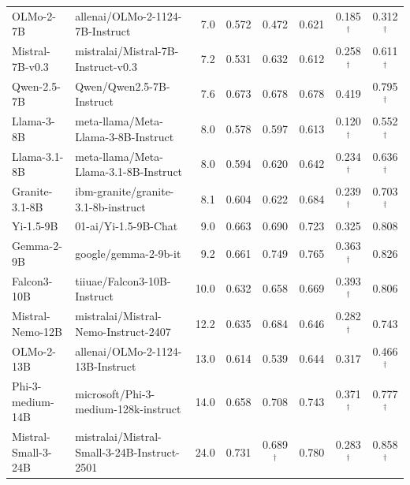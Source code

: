 \documentclass{article} %
\begin{document}
\begin{table}[H]
{\begin{tabular}{llrccccc}
OLMo-2-7B           & allenai/OLMo-2-1124-7B-Instruct            & 7.0  & 0.572            & 0.472            & 0.621            & 0.185$^\dagger$  & 0.312$^\dagger$  \\
Mistral-7B-v0.3     & mistralai/Mistral-7B-Instruct-v0.3         & 7.2  & 0.531            & 0.632            & 0.612            & 0.258$^\dagger$  & 0.611$^\dagger$  \\
Qwen-2.5-7B         & Qwen/Qwen2.5-7B-Instruct                   & 7.6  & 0.673            & 0.678            & 0.678            & 0.419            & 0.795$^\dagger$  \\
Llama-3-8B          & meta-llama/Meta-Llama-3-8B-Instruct        & 8.0  & 0.578            & 0.597            & 0.613            & 0.120$^\dagger$  & 0.552$^\dagger$  \\
Llama-3.1-8B        & meta-llama/Meta-Llama-3.1-8B-Instruct      & 8.0  & 0.594            & 0.620            & 0.642            & 0.234$^\dagger$  & 0.636$^\dagger$  \\
Granite-3.1-8B      & ibm-granite/granite-3.1-8b-instruct        & 8.1  & 0.604            & 0.622            & 0.684            & 0.239$^\dagger$  & 0.703$^\dagger$  \\
Yi-1.5-9B           & 01-ai/Yi-1.5-9B-Chat                       & 9.0  & 0.663            & 0.690            & 0.723            & 0.325            & 0.808            \\
Gemma-2-9B          & google/gemma-2-9b-it                        & 9.2  & 0.661            & 0.749            & 0.765            & 0.363$^\dagger$  & 0.826            \\
Falcon3-10B         & tiiuae/Falcon3-10B-Instruct                 & 10.0 & 0.632            & 0.658            & 0.669            & 0.393$^\dagger$  & 0.806            \\
Mistral-Nemo-12B    & mistralai/Mistral-Nemo-Instruct-2407        & 12.2 & 0.635            & 0.684            & 0.646            & 0.282$^\dagger$  & 0.743            \\
OLMo-2-13B          & allenai/OLMo-2-1124-13B-Instruct           & 13.0 & 0.614            & 0.539            & 0.644            & 0.317            & 0.466$^\dagger$  \\
Phi-3-medium-14B    & microsoft/Phi-3-medium-128k-instruct        & 14.0 & 0.658            & 0.708            & 0.743            & 0.371$^\dagger$  & 0.777$^\dagger$  \\
Mistral-Small-3-24B & mistralai/Mistral-Small-3-24B-Instruct-2501 & 24.0 & 0.731            & 0.689$^\dagger$  & 0.780            & 0.283$^\dagger$  & 0.858$^\dagger$  \\

\end{tabular}}
\end{table}
\end{document}

